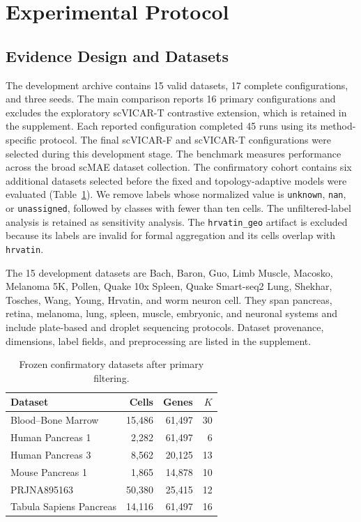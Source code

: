 \section{Experimental Protocol}
\label{sec:experiments}

\subsection{Evidence Design and Datasets}

The development archive contains 15 valid datasets, 17 complete configurations,
and three seeds. The main comparison reports 16 primary configurations and
excludes the exploratory scVICAR-T contrastive extension, which is retained in
the supplement. Each reported configuration completed 45 runs using its
method-specific protocol. The final scVICAR-F
and scVICAR-T configurations were selected during this development stage. The
benchmark measures performance across the broad scMAE dataset collection. The
confirmatory cohort contains six additional datasets selected before the fixed
and topology-adaptive models were evaluated (Table~\ref{tab:data}).
We remove labels whose normalized value is \texttt{unknown}, \texttt{nan}, or
\texttt{unassigned}, followed by classes with fewer than ten cells.  The
unfiltered-label analysis is retained as sensitivity analysis.  The
\texttt{hrvatin\_geo} artifact is excluded because its labels are invalid for
formal aggregation and its cells overlap with \texttt{hrvatin}.

The 15 development datasets are Bach, Baron, Guo, Limb Muscle, Macosko,
Melanoma 5K, Pollen, Quake 10x Spleen, Quake Smart-seq2 Lung, Shekhar,
Tosches, Wang, Young, Hrvatin, and worm neuron cell. They span pancreas,
retina, melanoma, lung, spleen, muscle, embryonic, and neuronal systems and
include plate-based and droplet sequencing protocols. Dataset provenance,
dimensions, label fields, and preprocessing are listed in the supplement.

\begin{table}[t]
\centering
\caption{Frozen confirmatory datasets after primary filtering.}
\label{tab:data}
\small
\begin{tabular}{lrrr}
\toprule
Dataset & Cells & Genes & $K$\\
\midrule
Blood--Bone Marrow & 15,486 & 61,497 & 30\\
Human Pancreas 1 & 2,282 & 61,497 & 6\\
Human Pancreas 3 & 8,562 & 20,125 & 13\\
Mouse Pancreas 1 & 1,865 & 14,878 & 10\\
PRJNA895163 & 50,380 & 25,415 & 12\\
Tabula Sapiens Pancreas & 14,116 & 61,497 & 16\\
\bottomrule
\end{tabular}
\end{table}

